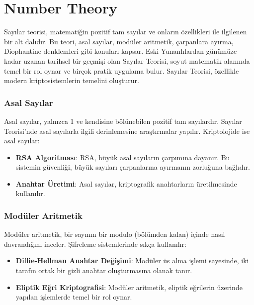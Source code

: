 \section{Number Theory}

Sayılar teorisi, matematiğin pozitif tam sayılar ve onların özellikleri ile ilgilenen bir alt dalıdır. Bu teori, asal sayılar, modüler aritmetik, çarpanlara ayırma, Diophantine denklemleri gibi konuları kapsar. Eski Yunanlılardan günümüze kadar uzanan tarihsel bir geçmişi olan Sayılar Teorisi, soyut matematik alanında temel bir rol oynar ve birçok pratik uygulama bulur. Sayılar Teorisi, özellikle modern kriptosistemlerin temelini oluşturur.

\subsubsection{Asal Sayılar}

Asal sayılar, yalnızca 1 ve kendisine bölünebilen pozitif tam sayılardır. Sayılar Teorisi'nde asal sayılarla ilgili derinlemesine araştırmalar yapılır. Kriptolojide ise asal sayılar:

\begin{itemize}
    \item \textbf{RSA Algoritması}: RSA, büyük asal sayıların çarpımına dayanır. Bu sistemin güvenliği, büyük sayıları çarpanlarına ayırmanın zorluğuna bağlıdır.
    \item \textbf{Anahtar Üretimi}: Asal sayılar, kriptografik anahtarların üretilmesinde kullanılır.
\end{itemize}

\subsubsection{Modüler Aritmetik}

Modüler aritmetik, bir sayının bir modulo (bölümden kalan) içinde nasıl davrandığını inceler. Şifreleme sistemlerinde sıkça kullanılır:

\begin{itemize}
    \item \textbf{Diffie-Hellman Anahtar Değişimi}: Modüler üs alma işlemi sayesinde, iki tarafın ortak bir gizli anahtar oluşturmasına olanak tanır.
    \item \textbf{Eliptik Eğri Kriptografisi}: Modüler aritmetik, eliptik eğrilerin üzerinde yapılan işlemlerde temel bir rol oynar.
\end{itemize}

\newpage

